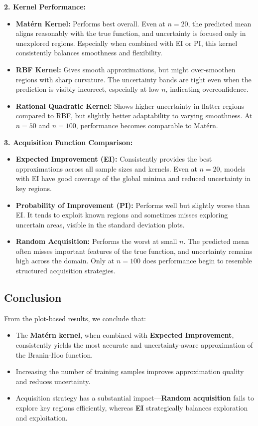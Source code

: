 \documentclass[a4paper,12pt]{article}
\begin{document}
\textbf{2. Kernel Performance:}
\begin{itemize}
    \item \textbf{Matérn Kernel:} Performs best overall. Even at $n = 20$, the predicted mean aligns reasonably with the true function, and uncertainty is focused only in unexplored regions. Especially when combined with EI or PI, this kernel consistently balances smoothness and flexibility.
    \item \textbf{RBF Kernel:} Gives smooth approximations, but might over-smoothen regions with sharp curvature. The uncertainty bands are tight even when the prediction is visibly incorrect, especially at low $n$, indicating overconfidence.
    \item \textbf{Rational Quadratic Kernel:} Shows higher uncertainty in flatter regions compared to RBF, but slightly better adaptability to varying smoothness. At $n = 50$ and $n = 100$, performance becomes comparable to Matérn.
\end{itemize}

\textbf{3. Acquisition Function Comparison:}
\begin{itemize}
    \item \textbf{Expected Improvement (EI):} Consistently provides the best approximations across all sample sizes and kernels. Even at $n = 20$, models with EI have good coverage of the global minima and reduced uncertainty in key regions.
    \item \textbf{Probability of Improvement (PI):} Performs well but slightly worse than EI. It tends to exploit known regions and sometimes misses exploring uncertain areas, visible in the standard deviation plots.
    \item \textbf{Random Acquisition:} Performs the worst at small $n$. The predicted mean often misses important features of the true function, and uncertainty remains high across the domain. Only at $n = 100$ does performance begin to resemble structured acquisition strategies.
\end{itemize}

\subsection*{Conclusion}

From the plot-based results, we conclude that:
\begin{itemize}
    \item The \textbf{Matérn kernel}, when combined with \textbf{Expected Improvement}, consistently yields the most accurate and uncertainty-aware approximation of the Branin-Hoo function.
    \item Increasing the number of training samples improves approximation quality and reduces uncertainty.
    \item Acquisition strategy has a substantial impact—\textbf{Random acquisition} fails to explore key regions efficiently, whereas \textbf{EI} strategically balances exploration and exploitation.
\end{itemize}
\end{document}
